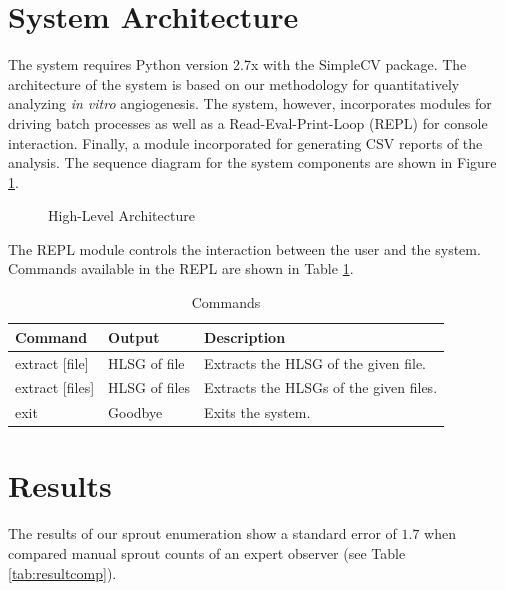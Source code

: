\documentclass{sig-alternate}
\newcommand{\invitro}{\emph{in vitro} }
\begin{document}
\section{System Architecture} %
\label{sec:System Architecture}
	The system requires Python version 2.7x with the SimpleCV package. The
	architecture of the system is based on our methodology for
	quantitatively analyzing \invitro angiogenesis. The system, however,
	incorporates modules for driving batch processes as well as a
	Read-Eval-Print-Loop (REPL) for console interaction. Finally, a module
	incorporated for generating CSV reports of the analysis. The sequence
	diagram for the system components are shown in Figure
	\ref{fig:sysarch}.
	\begin{figure}[ht!]
		\centering
		
		\caption{High-Level Architecture}
		\label{fig:sysarch}
	\end{figure}

	The REPL module controls the interaction between the user and the
	system. Commands available in the REPL are shown in Table
	\ref{tab:commands}.
	\begin{table}[h!]
		\begin{tabular}{| l | l | p{4cm} |}
			\hline
			\textbf{Command} & \textbf{Output} & \textbf{Description} \\\hline
			extract [file] & HLSG of file & Extracts the HLSG of the given file. \\\hline
			extract [files] & HLSG of files & Extracts the HLSGs of the given files. \\\hline
			exit & Goodbye & Exits the system. \\\hline
		\end{tabular}
		\caption{Commands}
		\label{tab:commands}
	\end{table}

\section{Results} %
\label{sec:Results}
	The results of our sprout enumeration show a standard error of $1.7$
	when compared manual sprout counts of an expert observer (see Table
	\ref{tab:resultcomp}).
\end{document}

